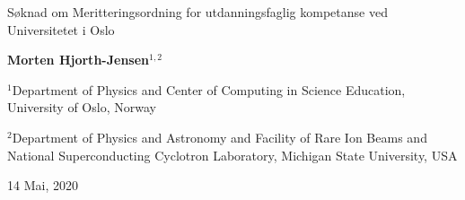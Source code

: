 \documentclass[%
oneside,                 %
final,                   %
10pt]{article}
\begin{document}

\newcommand{\exercisesection}[1]{\subsection*{#1}}






\thispagestyle{empty}

\begin{center}
{\LARGE\bf
\begin{spacing}{1.25}
Søknad om Meritteringsordning for utdanningsfaglig kompetanse ved Universitetet i Oslo
\end{spacing}
}
\end{center}


\begin{center}
{\bf Morten Hjorth-Jensen${}^{1, 2}$} \\ [0mm]
\end{center}

\begin{center}
\centerline{{\small ${}^1$Department of Physics and Center of Computing in Science Education, University of Oslo, Norway}}
\centerline{{\small ${}^2$Department of Physics and Astronomy and Facility of Rare Ion Beams and National Superconducting Cyclotron Laboratory, Michigan State University, USA}}
\end{center}
    

\begin{center}
14 Mai, 2020
\end{center}

\vspace{1cm}
\end{document}
